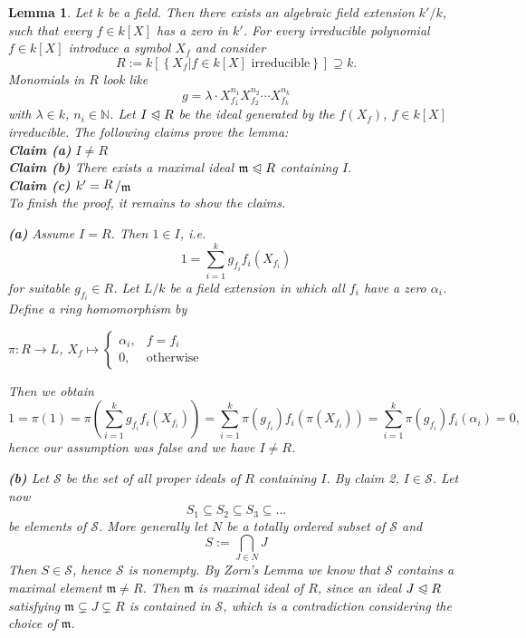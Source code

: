 \documentclass[11pt]{book}
\newtheorem{lemma}[theorem]{Lemma}
\theoremstyle{nonumberbreak}
\newenvironment{pr}[1][]{\ifthenelse{\equal{#1}{}}{\proof}{\proof[#1]}\rm}{\endproof}
\newcommand{\slant}[2]{{\raisebox{.1em}{$#1$}\left/\raisebox{-.1em}{$#2$}\right.}}
\begin{document}
\begin{spacing}{1.3}
\begin{lemma} %
Let $k$ be a field.
Then there exists an algebraic field extension $k'/k$, such that every $f \in k[X]$ has a zero in $k'$.
\begin{pr}
For every irreducible polynomial $f \in k[X]$ introduce a symbol $X_f$ and consider
$$R:=k[ \left\{X_f \big \vert  f \in k[X] \textrm{ irreducible}\right\}] \supseteq k.$$
Monomials in $R$ look like $$g=\lambda \cdot X_{f_1}^{n_1}X_{f_2}^{n_2}\cdots X_{f_k}^{n_k}$$ with $\lambda \in k$, $n_i \in \mathbb{N}$.
Let $I \trianglelefteqslant R$ be the ideal generated by the $f(X_f)$, $f \in k[X]$ irreducible.
The following claims prove the lemma:\\
\textbf{Claim (a)} $I \neq R$\\
\textbf{Claim (b)} There exists a maximal ideal $\mathfrak{m} \trianglelefteqslant R$ containing $I$.\\
\textbf{Claim (c)} $k'=\slant{R}{\mathfrak{m}}$\\
To finish the proof, it remains to show the claims.
\begin{compactenum}
\item[\textbf{(a)}] Assume $I=R$. Then $1 \in  I$, i.e. $$1= \sum_{i=1}^k g_{f_i} f_i\left(X_{f_i}\right)$$ for suitable $g_{f_i} \in R$.
Let $L/k$ be a field extension in which all $f_i$ have a zero $\alpha_i$. Define a ring homomorphism by
\begin{center} $\pi: R \longrightarrow L$, $X_f \mapsto \begin{cases} \alpha_i, & f=f_i \\ 0, & \textrm{otherwise} \end{cases}$\end{center}
Then we obtain
$$1=\pi(1)= \pi \left(\sum_{i=1}^k g_{f_i} f_i\left(X_{f_i}\right)\right)=\sum_{i=1}^k \pi(g_{f_i}) f_i \left(\pi(X_{f_i})\right)=\sum_{i=1}^k \pi(g_{f_i}) f_i \left(\alpha_i\right)=0,$$
hence our assumption was false and we have $I \neq R$.
\item[\textbf{(b)}] Let $\mathcal{S}$ be the set of all proper ideals of $R$ containing $I$. By claim 2, $I \in \mathcal{S}$.
Let now $$S_1 \subseteq S_2 \subseteq S_3 \subseteq \dots$$ be elements of $\mathcal{S}$.
More generally let $N$ be a totally ordered subset of $\mathcal{S}$ and $$S:=\bigcap_{J \in N} J$$Then $S \in \mathcal{S}$, hence $\mathcal{S}$ is nonempty. By Zorn's Lemma we know that $\mathcal{S}$ contains a maximal element $\mathfrak{m}\neq R$. Then $\mathfrak{m}$ is maximal ideal of $R$, since an ideal $J \trianglelefteqslant R$ satisfying $\mathfrak{m} \subsetneq J \subsetneq R$ is contained in $\mathcal{S}$, which is a contradiction considering the choice of $\mathfrak{m}$.

\end{compactenum}
\end{pr}
\end{lemma}
\end{spacing}
\end{document}
